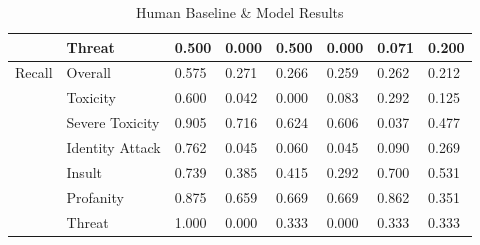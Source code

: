 \documentclass[11pt]{article}
\begin{document}
\begin{table}[h]
\begin{tabular}{llllllll}
\multicolumn{1}{l|}{}                & \multicolumn{1}{l|}{Threat}             & 0.500 & 0.000     & 0.500   & 0.000      & 0.071                                                                           & 0.200                                                                           \\ \hline
\multicolumn{1}{l|}{Recall}          & \multicolumn{1}{l|}{Overall}            & 0.575 & 0.271     & 0.266   & 0.259      & 0.262                                                                           & 0.212                                                                           \\ \cline{2-8} 
\multicolumn{1}{l|}{}                & \multicolumn{1}{l|}{Toxicity}           & 0.600 & 0.042     & 0.000   & 0.083      & 0.292                                                                           & 0.125                                                                           \\ \cline{2-8} 
\multicolumn{1}{l|}{}                & \multicolumn{1}{l|}{Severe Toxicity}    & 0.905 & 0.716     & 0.624   & 0.606      & 0.037                                                                           & 0.477                                                                           \\ \cline{2-8} 
\multicolumn{1}{l|}{}                & \multicolumn{1}{l|}{Identity Attack}    & 0.762 & 0.045     & 0.060   & 0.045      & 0.090                                                                           & 0.269                                                                           \\ \cline{2-8} 
\multicolumn{1}{l|}{}                & \multicolumn{1}{l|}{Insult}             & 0.739 & 0.385     & 0.415   & 0.292      & 0.700                                                                           & 0.531                                                                           \\ \cline{2-8} 
\multicolumn{1}{l|}{}                & \multicolumn{1}{l|}{Profanity}          & 0.875 & 0.659     & 0.669   & 0.669      & 0.862                                                                           & 0.351                                                                           \\ \cline{2-8} 
\multicolumn{1}{l|}{}                & \multicolumn{1}{l|}{Threat}             & 1.000 & 0.000     & 0.333   & 0.000      & 0.333                                                                           & 0.333                                                                           \\ \hline
\end{tabular}
\caption{\label{baseline-results}
 Human Baseline \& Model Results  }
\end{table}
\end{document}
